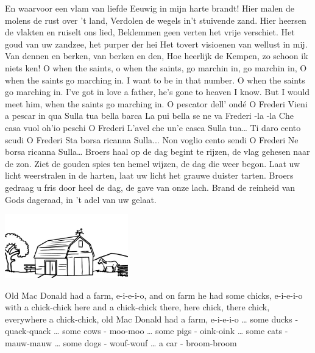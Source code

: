\documentclass{article}
\begin{document}
\begin{songs}{}
En waarvoor een vlam van liefde
Eeuwig in mijn harte brandt!
\endchorus
\beginverse*
Hier malen de molens de rust over 't land,
Verdolen de wegels in't stuivende zand.
Hier heersen de vlakten en ruiselt ons lied,
Beklemmen geen verten het vrije verschiet.
Het goud van uw zandzee, het purper der hei
Het tovert visioenen van wellust in mij.
Van dennen en berken, van berken en den,
Hoe heerlijk de Kempen, zo schoon ik niets ken!
\endverse
\endsong 
{}
\beginverse*
O when the saints, o when the saints,
go marchin in, go marchin in,
O when the saints go marching in.
I want to be in that number.
O when the saints go marching in.
\endverse
\beginchorus
I’ve got in love a father,
he’s gone to heaven I know.
But I would meet him,
when the saints go marching in.
\endchorus
\endsong 
{}
\beginverse*
O pescator dell’ ondé
O Frederi
Vieni a pescar in qua
Sulla tua bella barca
La pui bella se ne va
Frederi -la -la
\endverse
\beginverse*
Che casa vuol oh’io peschi	
O Frederi			
L’avel che un’e casca		
Sulla tua…			
\endverse
\beginverse*
Ti daro cento scudi	
O Frederi		
Sta borsa ricanna	
Sulla...			
\endverse
\beginverse*
Non voglio cento sendi	
O Frederi		
Ne borsa ricanna	
Sulla…			
\endverse
\endsong
{}
\beginverse*
Broers haal op de dag begint te rijzen,
de vlag gehesen naar de zon. 
Ziet de gouden spies ten hemel wijzen,
de dag die weer begon. 
Laat uw licht weerstralen in de harten, 
laat uw licht het grauwe duister tarten. 
Broers gedraag u fris door heel de dag,
de gave van onze lach. 
Brand de reinheid van Gods dageraad,
in 't adel van uw gelaat. 
\endverse
\endsong
\begin{intersong}
    \includegraphics[width=0.4\textwidth]{oldmacdonald}
\end{intersong}
\beginverse*
Old Mac Donald had a farm, e-i-e-i-o,
and on farm he had some chicks, e-i-e-i-o
with a chick-chick here and a chick-chick there,
here chick, there chick,
everywhere a chick-chick,
old Mac Donald had a farm, e-i-e-i-o
\endverse
\beginverse*
… some ducks - quack-quack
… some cows - moo-moo
… some pigs - oink-oink
… some cats - mauw-mauw
… some dogs - wouf-wouf
… a car - broom-broom
\endverse

\end{songs}
\end{document}
